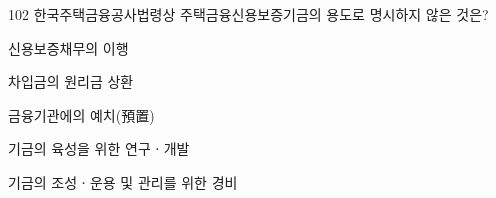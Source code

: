 \begin{question}{102}
한국주택금융공사법령상 주택금융신용보증기금의 용도로 명시하지 않은 것은?
\begin{choices}
  \item 신용보증채무의 이행
  \item 차입금의 원리금 상환
  \item 금융기관에의 예치(預置)
  \item 기금의 육성을 위한 연구ㆍ개발
  \item 기금의 조성ㆍ운용 및 관리를 위한 경비
\end{choices}
\end{question}

